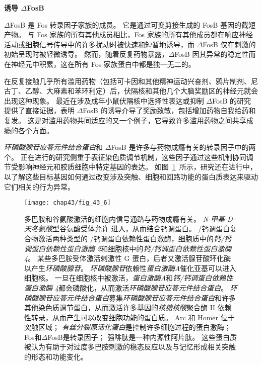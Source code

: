 \textbf{诱导 $\Delta$FosB}

$\Delta$FosB 是 Fos 转录因子家族的成员。
它是通过可变剪接生成的 FosB 基因的截短产物。
与 Fos 家族的所有其他成员相比，Fos 家族的所有其他成员都在响应神经活动或细胞信号传导中的许多扰动时被快速和短暂地诱导，而 $\Delta$FosB 仅在刺激的初始呈现时被轻微诱导。
然而，随着反复药物暴露，$\Delta$FosB 因其异常的稳定性而在神经元中积累，这在所有 Fos 家族蛋白中都是独一无二的。


在反复接触几乎所有滥用药物（包括可卡因和其他精神运动兴奋剂、鸦片制剂、尼古丁、乙醇、大麻素和苯环利定）后，伏隔核和其他几个大脑奖励区的神经元就会出现这种现象。
最近在涉及成年小鼠伏隔核中选择性表达或抑制 $\Delta$FosB 的研究提供了直接证据，表明 $\Delta$FosB 的诱导介导了奖励致敏，包括增加药物自我给药和复发。
这是对滥用药物共同适应的又一个例子，它导致许多滥用药物之间共享成瘾的各个方面。


\textit{环磷酸腺苷应答元件结合蛋白}和 $\Delta$FosB 是许多与药物成瘾有关的转录因子中的两个。
正在进行的研究侧重于表征染色质调节机制，这些因子通过这些机制协同调节受影响神经元和胶质细胞中特定基因的表达。
如图~\ref{fig:43_6}~所示，研究还在进行中，以了解这些目标基因如何通过改变涉及突触、细胞和回路功能的蛋白质表达来驱动它们相关的行为异常。


\begin{figure}[htbp]
	\centering
	\texttt{[image: chap43/fig\_43\_6]}
	\caption{多巴胺和谷氨酸激活的细胞内信号通路与药物成瘾有关。
		\textit{N-甲基-D-天冬氨酸}型谷氨酸受体允许  进入，从而结合钙调蛋白。
		/钙调蛋白复合物激活两种类型的 /钙调蛋白依赖性蛋白激酶，细胞质中的\textit{钙/钙调蛋白依赖性蛋白激酶 2}和细胞核中的\textit{钙/钙调蛋白依赖性蛋白激酶 4}。
		某些多巴胺受体激活刺激性 G 蛋白，后者又激活腺苷酸环化酶以产生\textit{环磷酸腺苷}。
		\textit{环磷酸腺苷}依赖性\textit{蛋白激酶A}催化亚基可以进入细胞核。
		一旦在细胞核中被激活，\textit{蛋白激酶A}和\textit{钙/钙调蛋白依赖性蛋白激酶 4}都会磷酸化，从而激活\textit{环磷酸腺苷应答元件结合蛋白}。
		\textit{环磷酸腺苷应答元件结合蛋白}募集\textit{环磷酸腺苷应答元件结合蛋白}和许多其他染色质调节蛋白，从而激活许多基因的\textit{核糖核酸}聚合酶 II 依赖性转录，从而产生可以改变细胞功能的蛋白质。
		Arc 和 Homer 位于突触区域；
		\textit{有丝分裂原活化蛋白}是控制许多细胞过程的蛋白激酶；
		Fos和$\Delta$FosB是转录因子；
		强啡肽是一种内源性阿片肽。
		这些蛋白质被认为有助于对过度多巴胺刺激的稳态反应以及与记忆形成相关突触的形态和功能变化。}
	\label{fig:43_6}
\end{figure}



